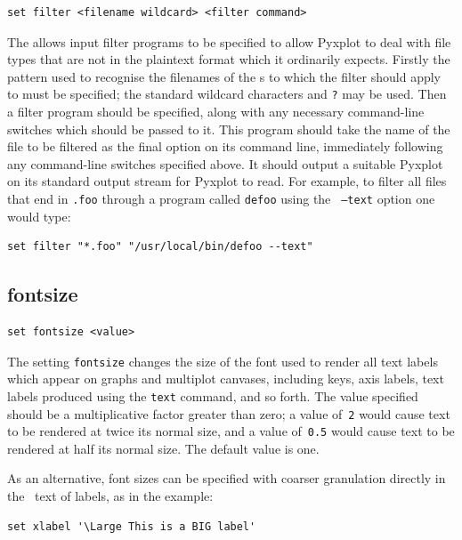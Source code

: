 \begin{verbatim}
set filter <filename wildcard> <filter command>
\end{verbatim}

The  allows input filter programs to be specified to allow
Pyxplot to deal with file types that are not in the plaintext format which it
ordinarily expects.  Firstly the pattern used to recognise the filenames of the
\datafile s to which the filter should apply to must be specified; the standard
wildcard characters {\tt *} and {\tt ?} may be used.  Then a filter program
should be specified, along with any necessary command-line switches which should
be passed to it.  This program should take the name of the file to be filtered
as the final option on its command line, immediately following any command-line
switches specified above.  It should output a suitable Pyxplot \datafile on its
standard output stream for Pyxplot to read.  For example, to filter all files
that end in {\tt .foo} through a program called {\tt defoo} using the {\tt
--text} option one would type:

\begin{verbatim}
set filter "*.foo" "/usr/local/bin/defoo --text"
\end{verbatim}

\subsection{fontsize}

\begin{verbatim}
set fontsize <value>
\end{verbatim}

The setting {\tt fontsize} changes the size of the font used to render all text
labels which appear on graphs and multiplot canvases, including keys, axis
labels, text labels produced using the {\tt text} command, and so forth. The
value specified should be a multiplicative factor greater than zero; a value
of~{\tt 2} would cause text to be rendered at twice its normal size, and a
value of~{\tt 0.5} would cause text to be rendered at half its normal size.
The default value is one.

As an alternative, font sizes can be specified with coarser granulation
directly in the \latexdcf\ text of labels, as in the example:

\begin{verbatim}
set xlabel '\Large This is a BIG label'
\end{verbatim}


